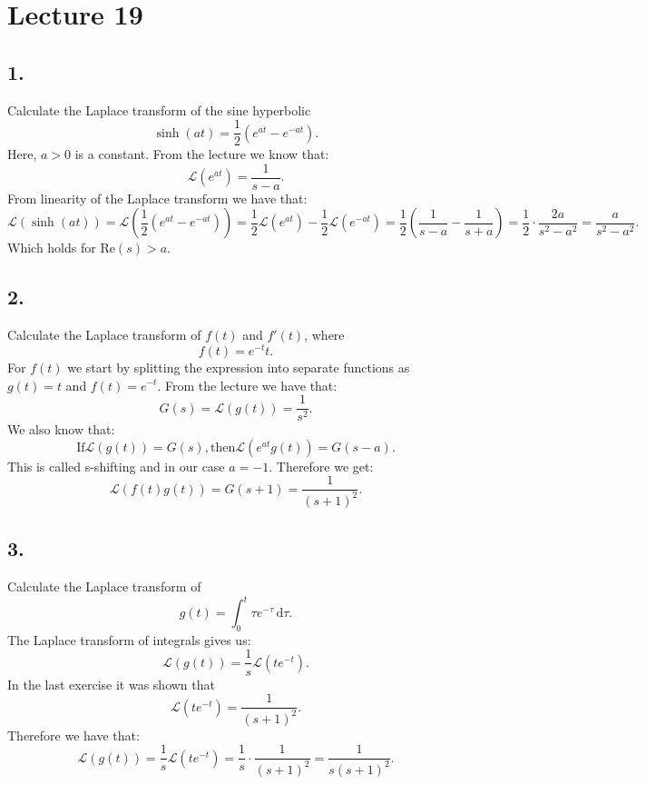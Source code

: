 \section*{Lecture 19}

\subsection*{1.} Calculate the Laplace transform of the sine hyperbolic
\[ 
\sinh(at) = \frac{1}{2}\left( e^{at}- e^{-at} \right) 
.\]
Here, $a > 0$ is a constant.
\bigbreak
From the lecture we know that:
\[ 
\mathcal{L}\left( e^{at} \right) = \frac{1}{s-a}
.\]
From linearity of the Laplace transform we have that:
\[ 
\mathcal{L}\left( \sinh \left( at \right)  \right) = \mathcal{L}\left( \frac{1}{2}\left( e^{at} - e^{-at} \right)  \right) = \frac{1}{2} \mathcal{L} \left( e^{at} \right) - \frac{1}{2}\mathcal{L} \left( e^{-at} \right) = \frac{1}{2} \left( \frac{1}{s-a} - \frac{1}{s+a} \right) = \frac{1}{2} \cdot \frac{2a}{s^2 - a^2} = \frac{a}{s^2 - a^2}
.\]
Which holds for $\mathrm{Re}(s) > a$.


\subsection*{2.} Calculate the Laplace transform of $f(t)$ and $f'(t)$, where
\[ 
f(t) = e^{-t}t
.\]
\bigbreak
For $f(t)$ we start by splitting the expression into separate functions as $g(t) = t$ and $f(t) = e^{-t}$. From the lecture we have that:
\[ 
G(s) = \mathcal{L}(g(t)) = \frac{1}{s^2}
.\]
We also know that:
\[ 
\mathrm{If } \mathcal{L}\left( g(t) \right) = G(s), \mathrm{ then } \mathcal{L}\left( e^{at} g(t) \right) = G (s-a)
.\]
This is called s-shifting and in our case $a = -1$. Therefore we get:
\[ 
\mathcal{L}\left( f(t)g(t) \right) = G(s+1) = \frac{1}{\left( s+1 \right)^2}
.\]


\subsection*{3.} Calculate the Laplace transform of
\[ 
g(t) = \int_{0}^{t} \tau e^{-\tau} \, \mathrm{d}\tau
.\]
\bigbreak
The Laplace transform of integrals gives us:
\[ 
\mathcal{L}(g(t)) = \frac{1}{s} \mathcal{L}\left( te^{-t} \right) 
.\]
In the last exercise it was shown that
\[ 
\mathcal{L}\left( te^{-t} \right) = \frac{1}{\left( s+1 \right)^2}
.\]
Therefore we have that:
\[ 
\mathcal{L}\left( g(t) \right) = \frac{1}{s} \mathcal{L}\left( te^{-t} \right) = \frac{1}{s} \cdot \frac{1}{\left( s+1 \right)^2} = \frac{1}{s \left( s+1 \right)^2}
.\]


